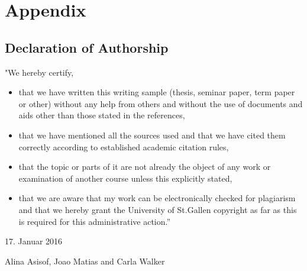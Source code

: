 \documentclass[12pt,a4paper,bibliography=totocnumbered,listof=totocnumbered]{scrartcl}
\begin{document}


\section{Appendix}



\subsection{Declaration of Authorship}

"We hereby certify,

\begin{itemize}
         \item  that we have written this writing sample (thesis, seminar paper, term paper or
other) without any help from others and without the use of documents and aids
other than those stated in the references, 
	  \item  that we have mentioned all the sources used and that we have cited them correctly
according to established academic citation rules, 
	  \item that the topic or parts of it are not already the object of any work or examination
of another course unless this explicitly stated, 
	  \item that we are aware that my work can be electronically checked for plagiarism and
that we hereby grant the University of St.Gallen copyright as far as this is required
for this administrative action.” 
\end{itemize}

17. Januar 2016 

Alina Asisof, Joao Matias and Carla Walker 
\end{document}

